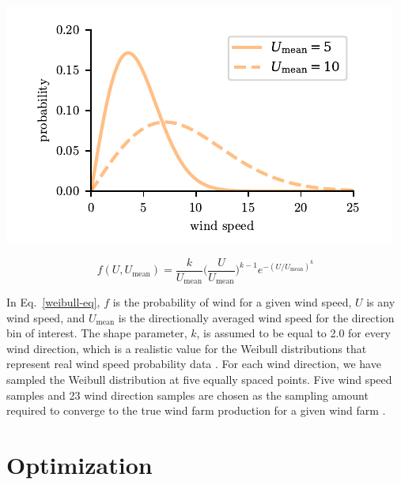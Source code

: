 \documentclass[wes, manuscript]{copernicus}
\begin{document}
	\begin{minipage}{0.5\textwidth}
            \includegraphics{paper-figures/weibull}
            
        \end{minipage}
        \begin{minipage}{0.5\textwidth}
            \begin{equation}
                f(U,U_\text{mean}) = \frac{k}{U_\text{mean}}\Big(\frac{U}{U_\text{mean}}\Big)^{k-1}e^{-(U/U_\text{mean})^k}
            \label{weibull-eq}
            \end{equation}
        \end{minipage}\quad
        
        \bigskip
\noindent In Eq.~\ref{weibull-eq}, $f$ is the probability of wind for a given wind speed, $U$ is any wind speed, and $U_\text{mean}$ is the directionally averaged wind speed for the direction bin of interest. The shape parameter, $k$, is assumed to be equal to 2.0 for every wind direction, which is a realistic value for the Weibull distributions that represent real wind speed probability data \citep{rehman1994weibull,seguro2000modern}.
For each wind direction, we have sampled the Weibull distribution at five equally spaced points. Five wind speed samples and 23 wind direction samples are chosen as the sampling amount required to converge to the true wind farm production for a given wind farm \citep{Stanley2018a}. 



\section{Optimization}
\end{document}
